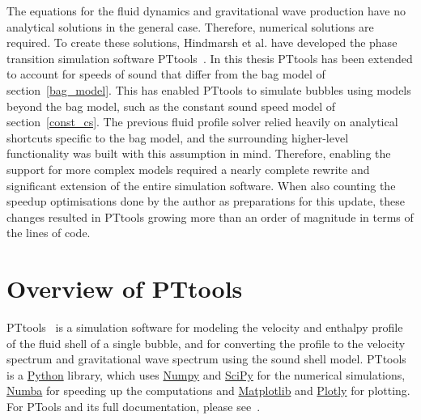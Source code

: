 The equations for the fluid dynamics and gravitational wave production have no analytical solutions in the general case.
Therefore, numerical solutions are required.
To create these solutions, Hindmarsh et al. have developed the phase transition simulation software PTtools~\cite{pttools}.
In this thesis PTtools has been extended to account for speeds of sound that differ from the bag model of section~\ref{bag_model}.
This has enabled PTtools to simulate bubbles using models beyond the bag model,
such as the constant sound speed model of section~\ref{const_cs}.
The previous fluid profile solver relied heavily on analytical shortcuts specific to the bag model,
and the surrounding higher-level functionality was built with this assumption in mind.
Therefore, enabling the support for more complex models required a nearly complete rewrite and significant extension of the entire simulation software.
When also counting the speedup optimisations done by the author as preparations for this update,
these changes resulted in PTtools growing more than an order of magnitude in terms of the lines of code.


\section{Overview of PTtools}
PTtools~\cite{pttools} is a simulation software for modeling the velocity and enthalpy profile of the fluid shell of a single bubble,
and for converting the profile to the velocity spectrum and gravitational wave spectrum using the sound shell model.
PTtools is a
\href{https://www.python.org/}{Python}
library, which uses
\href{https://numpy.org/}{Numpy}
and
\href{https://scipy.org/}{SciPy}
for the numerical simulations,
\href{https://numba.pydata.org/}{Numba}
for speeding up the computations and
\href{https://matplotlib.org/}{Matplotlib}
and
\href{https://plotly.com/}{Plotly}
for plotting.
For PTools and its full documentation, please see~\cite{pttools}.

